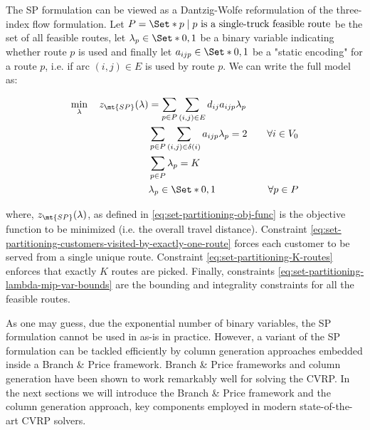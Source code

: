 The SP formulation can be viewed as a Dantzig-Wolfe reformulation \parencite{dantzig_decomposition_1960} of the three-index flow formulation.
Let $P = \Set*{p \mid p\ \text{is a single-truck feasible route}}$ be the set of all feasible routes,
let $\lambda_p \in \Set*{0, 1}$ be a binary variable indicating whether route $p$ is used
and finally let $a_{ijp} \in \Set*{0, 1}$ be a "static encoding" for a route $p$, i.e. if arc $(i, j) \in E$ is used by route $p$.
We can write the full model as:


\begin{align}
	\min_{\lambda} \quad z_\mt{SP}(\lambda) & = \sum_{p \in P} \sum_{(i, j) \in E} d_{ij} a_{ijp} \lambda_p \label{eq:set-partitioning-obj-func}                                                                                                                                           \\
	                                        & \sum_{p \in P} \sum_{(i, j) \in \delta(i)} a_{ijp} \lambda_p = 2                                   & \quad \forall i \in V_0                                              \label{eq:set-partitioning-customers-visited-by-exactly-one-route} \\
	                                        & \sum_{p \in P} \lambda_{p} = K\label{eq:set-partitioning-K-routes}                                                                                                                                                                           \\
	                                        & \lambda_p                    \in \Set*{0, 1}                                                       & \quad \forall p \in P \label{eq:set-partitioning-lambda-mip-var-bounds}
\end{align}

where, $z_\mt{SP}(\lambda)$, as defined in \eqref{eq:set-partitioning-obj-func} is the objective function to be minimized (i.e. the overall travel distance).
Constraint \eqref{eq:set-partitioning-customers-visited-by-exactly-one-route} forces each customer to be served from a single unique route.
Constraint \eqref{eq:set-partitioning-K-routes} enforces that exactly $K$ routes are picked.
Finally, constraints \eqref{eq:set-partitioning-lambda-mip-var-bounds} are the bounding and integrality constraints for all the feasible routes.


As one may guess, due the exponential number of binary variables, the SP formulation cannot be used in as-is in practice.
However, a variant of the SP formulation can be tackled efficiently by column generation approaches embedded inside a Branch \& Price framework.
Branch \& Price frameworks and column generation have been shown to work remarkably well for solving the CVRP.
In the next sections we will introduce the Branch \& Price framework and the column generation approach, key components employed in modern state-of-the-art CVRP solvers.

